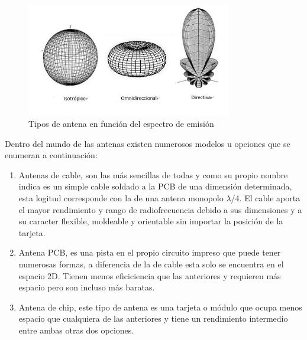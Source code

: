 \documentclass[paper=a4, fontsize=11pt,twoside]{scrartcl}	%
\begin{document}
            \begin{center}
                \begin{figure}[h]
                    \centering
                    \includegraphics[width=0.8\textwidth]{antenna_types.PNG}
                    \caption{Tipos de antena en función del espectro de emisión}
                    \label{fig:mesh10}
                \end{figure}
            \end{center}
            Dentro del mundo de las antenas existen numerosos modelos u opciones que se enumeran a continuación:
            \begin{enumerate}
                \item Antenas de cable, son las más sencillas de todas y como su propio nombre indica es un simple cable soldado a la PCB de una dimensión determinada, esta logitud corresponde con la de una antena monopolo $\lambda$/4. El cable aporta el mayor rendimiento y rango de radiofrecuencia debido a sus dimensiones y a su caracter flexible, moldeable y orientable sin importar  la posición de la tarjeta.
                \item Antena PCB, es una pista en el propio circuito impreso que puede tener numerosas formas, a diferencia de la de cable esta solo se encuentra en el espacio 2D. Tienen menos eficiciencia que las anteriores y requieren más espacio pero son incluso más baratas.
                \item Antena de chip, este tipo de antena es una tarjeta o módulo que ocupa menos espacio que cualquiera de las anteriores y tiene un rendimiento intermedio entre ambas otras dos opciones.
            \end{enumerate}
\end{document}
